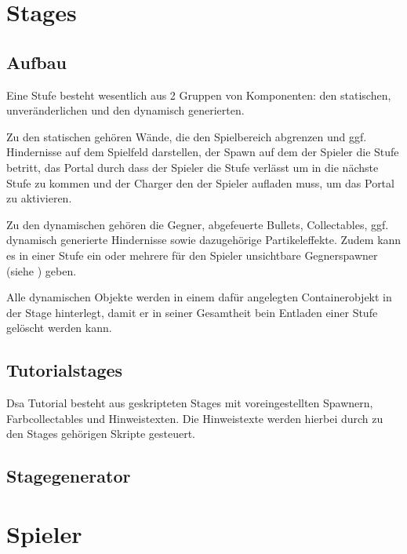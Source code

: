 \documentclass[a4paper,10pt,ngerman,fontsize=12pt]{scrreprt}
\begin{document}
\section{Stages}
\label{sect:stages}


\subsection{Aufbau}

Eine Stufe besteht wesentlich aus 2 Gruppen von Komponenten: den statischen, unveränderlichen und den dynamisch generierten.

Zu den statischen gehören Wände, die den Spielbereich abgrenzen und ggf. Hindernisse auf dem Spielfeld darstellen, der Spawn auf dem der Spieler die Stufe betritt, das Portal durch dass der Spieler die Stufe verlässt um in die nächste Stufe zu kommen und der Charger den der Spieler aufladen muss, um das Portal zu aktivieren.

Zu den dynamischen gehören die Gegner, abgefeuerte Bullets, Collectables, ggf. dynamisch generierte Hindernisse sowie dazugehörige Partikeleffekte. Zudem kann es in einer Stufe ein oder mehrere für den Spieler unsichtbare Gegnerspawner (siehe ) geben.

Alle dynamischen Objekte werden in einem dafür angelegten Containerobjekt in der Stage hinterlegt, damit er in seiner Gesamtheit bein Entladen einer Stufe gelöscht werden kann.



\subsection{Tutorialstages}

Dsa Tutorial besteht aus geskripteten Stages mit voreingestellten Spawnern, Farbcollectables und Hinweistexten. Die Hinweistexte werden hierbei durch zu den Stages gehörigen Skripte gesteuert.



\subsection{Stagegenerator}

\lipsum[3]



\section{Spieler}
\end{document}
